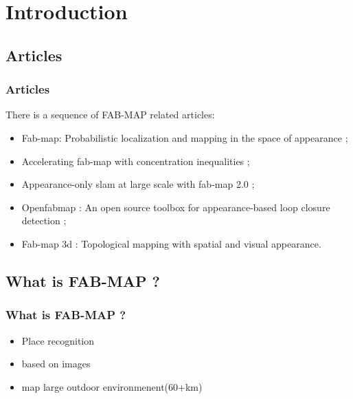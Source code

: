 \section{Introduction}

\subsection{Articles}
\begin{frame}
    \frametitle{Articles}
    There is a sequence of FAB-MAP related articles:
    \begin{itemize}
        \item Fab-map: Probabilistic localization and mapping in the space of
appearance\cite{fabmap2008} ;
        \item Accelerating fab-map with concentration inequalities\cite{accelerating} ;
        \item Appearance-only slam at large scale with fab-map 2.0\cite{fabmap2011} ;
        \item Openfabmap : An open source toolbox for appearance-based loop closure detection\cite{openfabmap} ;
        \item Fab-map 3d : Topological mapping with spatial and visual appearance\cite{fabmap3d}.
    \end{itemize}
\end{frame}

\subsection{What is FAB-MAP ?}
\begin{frame}
    \frametitle{What is FAB-MAP ?}
    \begin{itemize}
        \item Place recognition
        \item based on images
        \item map large outdoor environmenent(60+km)
    \end{itemize}
\end{frame}
